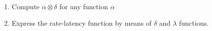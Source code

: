 \begin{problem}
\begin{enumerate}
        \item Compute $\alpha \otimes \delta$ for any function $\alpha$
        \item Express the rate-latency function by means of $\delta$ and
        $\lambda$ functions.
\end{enumerate}
\end{problem}
